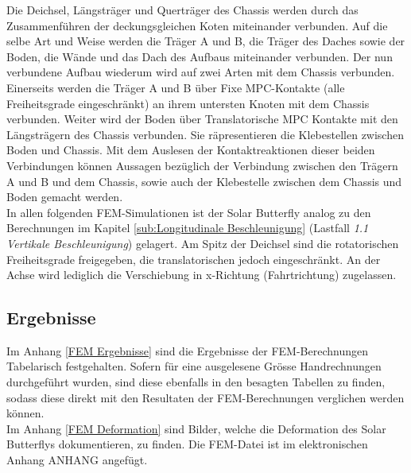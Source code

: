 Die Deichsel, Längsträger und Querträger des Chassis werden durch das Zusammenführen der deckungsgleichen Koten miteinander verbunden. Auf die selbe Art und Weise werden die Träger A und B, die Träger des Daches sowie der Boden, die Wände und das Dach des Aufbaus miteinander verbunden. Der nun verbundene Aufbau wiederum wird auf zwei Arten mit dem Chassis verbunden. Einerseits werden die Träger A und B über Fixe MPC-Kontakte (alle Freiheitsgrade eingeschränkt) an ihrem untersten Knoten mit dem Chassis verbunden. Weiter wird der Boden über Translatorische MPC Kontakte mit den Längsträgern des Chassis verbunden. Sie räpresentieren die Klebestellen zwischen Boden und Chassis. Mit dem Auslesen der Kontaktreaktionen dieser beiden Verbindungen können Aussagen bezüglich der Verbindung zwischen den Trägern A und B und dem Chassis, sowie auch der Klebestelle zwischen dem Chassis und Boden gemacht werden.\\
In allen folgenden FEM-Simulationen ist der Solar Butterfly analog zu den Berechnungen im Kapitel \ref{sub:Longitudinale Beschleunigung} (Lastfall \emph{1.1 Vertikale Beschleunigung}) gelagert. Am Spitz der Deichsel sind die rotatorischen Freiheitsgrade freigegeben, die translatorischen jedoch eingeschränkt. An der Achse wird lediglich die Verschiebung in x-Richtung (Fahrtrichtung) zugelassen.


\subsection{Ergebnisse}
Im Anhang \ref{FEM Ergebnisse} sind die Ergebnisse der FEM-Berechnungen Tabelarisch festgehalten. Sofern für eine ausgelesene Grösse Handrechnungen durchgeführt wurden, sind diese ebenfalls in den besagten Tabellen zu finden, sodass diese direkt mit den Resultaten der FEM-Berechnungen verglichen werden können.\\
Im Anhang \ref{FEM Deformation} sind Bilder, welche die Deformation des Solar Butterflys dokumentieren, zu finden. Die FEM-Datei ist im elektronischen Anhang ANHANG angefügt.


